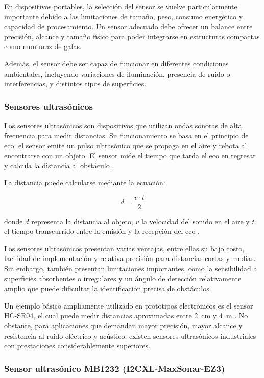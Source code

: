 En dispositivos portables, la selección del sensor se vuelve particularmente importante debido a las limitaciones de tamaño, peso, consumo energético y capacidad de procesamiento. Un sensor adecuado debe ofrecer un balance entre precisión, alcance y tamaño físico para poder integrarse en estructuras compactas como monturas de gafas.

Además, el sensor debe ser capaz de funcionar en diferentes condiciones ambientales, incluyendo variaciones de iluminación, presencia de ruido o interferencias, y distintos tipos de superficies.

\subsubsection{Sensores ultrasónicos}

Los sensores ultrasónicos son dispositivos que utilizan ondas sonoras de alta frecuencia para medir distancias. Su funcionamiento se basa en el principio de eco: el sensor emite un pulso ultrasónico que se propaga en el aire y rebota al encontrarse con un objeto. El sensor mide el tiempo que tarda el eco en regresar y calcula la distancia al obstáculo \cite{hcsr04_datasheet}.

La distancia puede calcularse mediante la ecuación:

\[
d = \frac{v \cdot t}{2}
\]

donde $d$ representa la distancia al objeto, $v$ la velocidad del sonido en el aire y $t$ el tiempo transcurrido entre la emisión y la recepción del eco \cite{hcsr04_datasheet}.

Los sensores ultrasónicos presentan varias ventajas, entre ellas su bajo costo, facilidad de implementación y relativa precisión para distancias cortas y medias. Sin embargo, también presentan limitaciones importantes, como la sensibilidad a superficies absorbentes o irregulares y un ángulo de detección relativamente amplio que puede dificultar la identificación precisa de obstáculos.

Un ejemplo básico ampliamente utilizado en prototipos electrónicos es el sensor HC-SR04, el cual puede medir distancias aproximadas entre 2~cm y 4~m \cite{hcsr04_datasheet}. No obstante, para aplicaciones que demandan mayor precisión, mayor alcance y resistencia al ruido eléctrico y acústico, existen sensores ultrasónicos industriales con prestaciones considerablemente superiores.

\subsubsection{Sensor ultrasónico MB1232 (I2CXL-MaxSonar-EZ3)}

